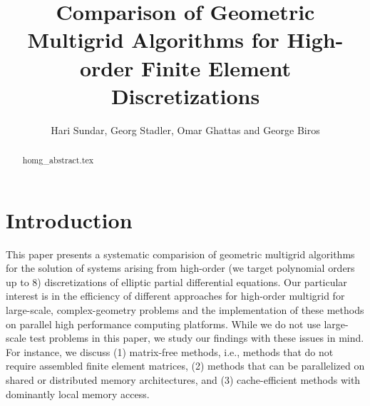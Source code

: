 \documentclass[times]{nlaauth}
\begin{document}

\title{Comparison of Geometric Multigrid Algorithms for High-order Finite Element Discretizations}

\author{Hari Sundar\corrauth, Georg Stadler, Omar Ghattas and George Biros}

\address{Institute for Computational Engineering \& Sciences, University of Texas, Austin, TX 78712}


\begin{abstract}
 {homg_abstract.tex}
\end{abstract}


\maketitle


\section{Introduction}


This paper presents a systematic comparision of geometric multigrid
algorithms for the solution of systems arising from high-order (we
target polynomial orders up to 8) discretizations of elliptic partial
differential equations. Our particular interest is in the efficiency
of different approaches for high-order multigrid for large-scale,
complex-geometry problems and the implementation of these methods on
parallel high performance computing platforms. While we do not use
large-scale test problems in this paper, we study our findings with
these issues in mind. For instance, we discuss (1) matrix-free
methods, i.e., methods that do not require assembled finite element
matrices, (2) methods that can be parallelized on shared or
distributed memory architectures, and (3) cache-efficient methods with
dominantly local memory access.
\end{document}

